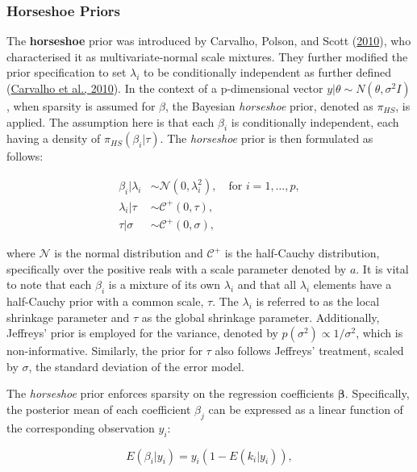 \documentclass[
  11pt,
]{article}
\begin{document}
\subsubsection{Horseshoe Priors}

The \textbf{horseshoe} prior was introduced by Carvalho, Polson, and
Scott (\protect\hyperlink{ref-Carvalho2010}{2010}), who characterised it
as multivariate-normal scale mixtures. They further modified the prior
specification to set \(\lambda_i\) to be conditionally independent as
further defined (\protect\hyperlink{ref-Carvalho2010}{Carvalho et al.,
2010}). In the context of a p-dimensional vector
\(y|\theta \sim N(\theta, \sigma^2I)\), when sparsity is assumed for
\(\beta\), the Bayesian \emph{horseshoe} prior, denoted as \(\pi_{HS}\),
is applied. The assumption here is that each \(\beta_i\) is
conditionally independent, each having a density of
\(\pi_{HS} (\beta_i | \tau)\). The \emph{horseshoe} prior is then
formulated as follows:

\begin{align*}
\beta_i | \lambda_i &\sim \mathcal{N}(0, \lambda_i^2), \quad \text{for } i = 1,\ldots,p, \\
\lambda_i | \tau &\sim \mathcal{C}^+(0, \tau), \\
\tau | \sigma &\sim \mathcal{C}^+(0, \sigma), 
\end{align*}

where \(\mathcal{N}\) is the normal distribution and \(\mathcal{C}^+\)
is the half-Cauchy distribution, specifically over the positive reals
with a scale parameter denoted by \(a\). It is vital to note that each
\(\beta_i\) is a mixture of its own \(\lambda_i\) and that all
\(\lambda_i\) elements have a half-Cauchy prior with a common scale,
\(\tau\). The \(\lambda_i\) is referred to as the local shrinkage
parameter and \(\tau\) as the global shrinkage parameter. Additionally,
Jeffreys' prior is employed for the variance, denoted by
\(p(\sigma^2) \propto 1/\sigma^2\), which is non-informative. Similarly,
the prior for \(\tau\) also follows Jeffreys' treatment, scaled by
\(\sigma\), the standard deviation of the error model.

The \emph{horseshoe} prior enforces sparsity on the regression
coefficients \(\boldsymbol{\beta}\). Specifically, the posterior mean of
each coefficient \(\beta_j\) can be expressed as a linear function of
the corresponding observation \(y_i\):

\begin{equation}
E(\beta_i|y_i) = y_i(1 - E(k_i|y_i)),
\end{equation}
\end{document}

